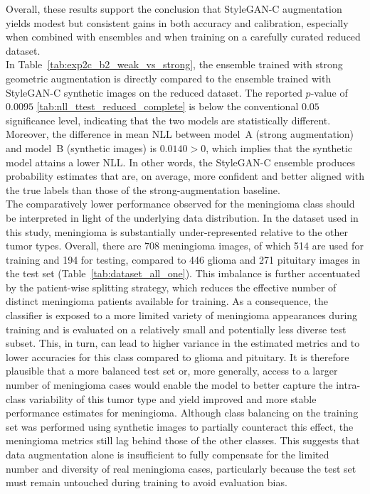 Overall, these results support the conclusion that StyleGAN-C augmentation yields modest but consistent gains in both accuracy and calibration, especially when combined with ensembles and when training on a carefully curated reduced dataset.\\






In Table~\ref{tab:exp2c_b2_weak_vs_strong}, the ensemble trained with strong geometric augmentation is directly compared to the ensemble trained with StyleGAN-C synthetic images on the reduced dataset. The reported $p$-value of $0.0095$ \ref{tab:nll_ttest_reduced_complete} is below the conventional $0.05$ significance level, indicating that the two models are statistically different. Moreover, the difference in mean NLL between model~A (strong augmentation) and model~B (synthetic images) is $0.0140 > 0$, which implies that the synthetic model attains a lower NLL. In other words, the StyleGAN-C ensemble produces probability estimates that are, on average, more confident and better aligned with the true labels than those of the strong-augmentation baseline.\\

The comparatively lower performance observed for the meningioma class should be interpreted in light of the underlying data distribution. In the dataset used in this study, meningioma is substantially under-represented relative to the other tumor types. Overall, there are 708 meningioma images, of which 514 are used for training and 194 for testing, compared to 446 glioma and 271 pituitary images in the test set (Table~\ref{tab:dataset_all_one}). This imbalance is further accentuated by the patient-wise splitting strategy, which reduces the effective number of distinct meningioma patients available for training. As a consequence, the classifier is exposed to a more limited variety of meningioma appearances during training and is evaluated on a relatively small and potentially less diverse test subset. This, in turn, can lead to higher variance in the estimated metrics and to lower accuracies for this class compared to glioma and pituitary. It is therefore plausible that a more balanced test set or, more generally, access to a larger number of meningioma cases would enable the model to better capture the intra-class variability of this tumor type and yield improved and more stable performance estimates for meningioma. Although class balancing on the training set was performed using synthetic images to partially counteract this effect, the meningioma metrics still lag behind those of the other classes. This suggests that data augmentation alone is insufficient to fully compensate for the limited number and diversity of real meningioma cases, particularly because the test set must remain untouched during training to avoid evaluation bias.\\

